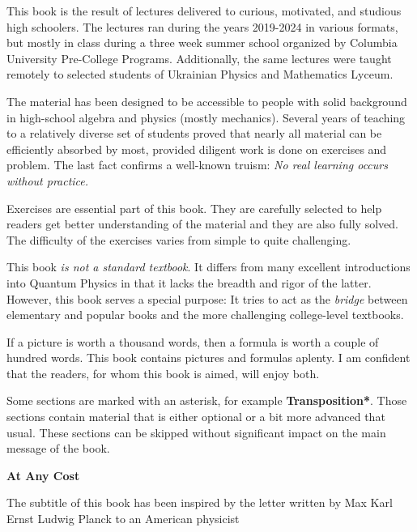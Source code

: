 This book is the result of lectures delivered to curious, motivated, and studious high schoolers. The lectures ran  during the years 2019-2024 in various formats, but mostly in class during a three week summer school organized by Columbia University Pre-College Programs. Additionally, the same lectures were taught remotely to selected students of Ukrainian Physics and Mathematics Lyceum. 

The material has been designed to be accessible to people with solid background in high-school algebra and physics (mostly mechanics). Several years of teaching to a relatively diverse set of students proved that nearly all material can be efficiently absorbed by most, provided diligent work is done on exercises and problem. The last fact confirms a well-known truism: \emph{No real learning occurs without practice.}

Exercises are essential part of this book.  They are carefully selected to help readers get better understanding of the material and they are also fully solved. The difficulty of the exercises varies from simple to quite challenging.

This book \emph{is not a standard textbook}. It differs from many excellent introductions into Quantum Physics in that it lacks the breadth and rigor of the latter. However, this book serves a special purpose: It tries to act as the \emph{bridge} between  elementary and popular books and the more challenging college-level textbooks. 

If a picture is worth a thousand words, then a formula is worth a couple of hundred words. This book contains pictures and formulas aplenty. I am confident that the readers, for whom this book is aimed, will enjoy both.

Some sections are marked with an asterisk, for example
{\bf Transposition*}. Those sections contain material that is either
optional or a bit more advanced that usual. These sections can be
skipped without significant impact on the main message of the book.


\begin{center}
	{\bf At Any Cost}
\end{center}

The subtitle of this book has been inspired by the letter written by Max Karl Ernst Ludwig Planck to an American physicist


